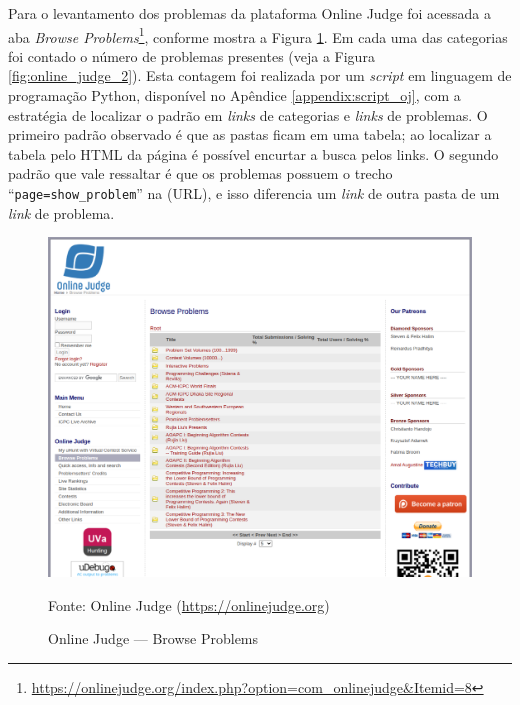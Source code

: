 Para o levantamento dos problemas da plataforma Online Judge foi acessada a aba \textit{Browse Problems}\footnote{\url{https://onlinejudge.org/index.php?option=com\_onlinejudge\&Itemid=8}}, conforme mostra a Figura \ref{fig:online_judge_1}. Em cada uma das categorias foi contado o número de problemas presentes (veja a Figura \ref{fig:online_judge_2}). Esta contagem foi realizada por um \textit{script} em linguagem de programação Python, disponível no Apêndice \ref{appendix:script_oj}, com a estratégia de localizar o padrão em \textit{links} de categorias e \textit{links} de problemas. O primeiro padrão observado é que as pastas ficam em uma tabela; ao localizar a tabela pelo HTML da página é possível encurtar a busca pelos links. O segundo padrão que vale ressaltar é que os problemas possuem o trecho ``\texttt{page=show\_problem}'' na (URL), e isso diferencia um \textit{link} de outra pasta de um \textit{link} de problema.

\begin{figure}
    \centering
    \caption{Online Judge — Browse Problems}
    \includegraphics[keepaspectratio=true,scale=0.32]{figuras/online_judge_1.eps}
    \label{fig:online_judge_1}
    
    \medskip
    Fonte: Online Judge (\url{https://onlinejudge.org})
    \medskip
    
\end{figure}


